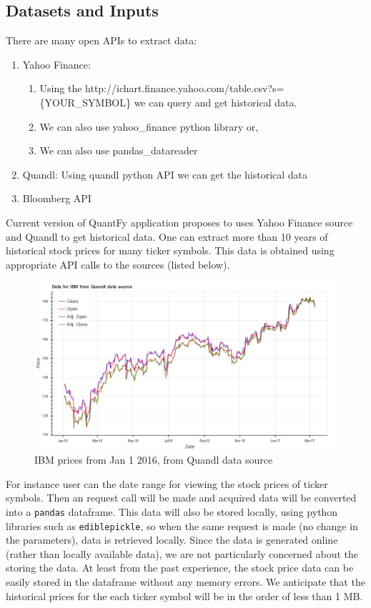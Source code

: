 \documentclass[12pt]{article}
\begin{document}
\begin{itemize}
\section{Datasets and Inputs} 
\label{sec:datasets}
There are many open APIs to extract data:
\begin{enumerate}
\item Yahoo Finance:
\begin{enumerate}
\item Using the http://ichart.finance.yahoo.com/table.csv?s=\{YOUR\_SYMBOL\} we can query and get historical data.
\item We can also use yahoo\_finance python library or,
\item We can also use pandas\_datareader
\end{enumerate}
\item Quandl: Using quandl python API we can get the historical data
\item Bloomberg API
\end{enumerate}
Current version of QuantFy application proposes to uses Yahoo Finance source and Quandl to get historical data. One can extract more than 10 years of historical stock prices for many ticker symbols. This data is obtained using appropriate API calls to the sources (listed below). 

\begin{figure}[!htbp]
\begin{center}
\includegraphics[height=0.5\textheight,width=\textwidth]{price_plot_IBM.png}
\caption{IBM prices from Jan 1 2016, from Quandl data source}
\label{fig:ibm_price}
\end{center}
\end{figure}

For instance user can the date range for viewing the stock prices of ticker symbols. Then an request call will be made and acquired data will be converted into a \texttt{pandas}  dataframe. This data will also be stored locally, using python libraries such as \texttt{ediblepickle}, so when the same request is made (no change in the parameters), data is retrieved locally. Since the data is generated online (rather than locally available data), we are not particularly concerned about the storing the data. At least from the past experience, the stock price data can be easily stored in the dataframe without any memory errors. We anticipate that the historical prices for the each ticker symbol will be in the order of less than 1 MB.


\end{itemize}
\end{document}

